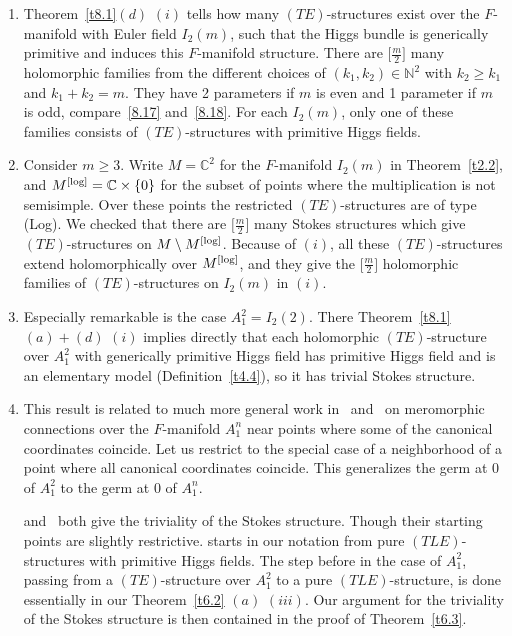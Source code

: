 \documentclass[10pt,a4paper]{amsart}
\numberwithin{equation}{section}
\numberwithin{figure}{section}
\newcommand{\N}{{\mathbb N}}
\newcommand{\C}{{\mathbb C}}
\begin{document}
\begin{Remarks}\label{t8.8}\quad

\begin{enumerate}\itemsep=0pt
\item[$(i)$] Theorem~\ref{t8.1}$(d)$ $(i)$ tells how many $(TE)$-structures
exist over the $F$-manifold with \mbox{Euler} field $I_2(m)$,
such that the Higgs bundle is generically primitive
and induces this $F$-manifold structure.
There are $\big[\frac{m}{2}\big]$ many holomorphic families
from the different choices of $(k_1,k_2)\allowbreak\in\N^2$ with
$k_2\geq k_1$ and $k_1+k_2=m$.
They have 2 parameters if $m$ is even and 1 parameter
if $m$ is odd, compare~\eqref{8.17} and~\eqref{8.18}.
For each $I_2(m)$, only one of these families consists
of $(TE)$-structures with primitive Higgs fields.

\item[$(ii)$] Consider $m\geq 3$.
Write $M=\C^2$ for the $F$-manifold $I_2(m)$
in Theorem~\ref{t2.2}, and $M^{\rm [log]}=\C\times\{0\}$
for the subset of points where the multiplication
is not semisimple. Over these points the restricted
$(TE)$-structures are of type (Log).
We checked that there are $\big[\frac{m}{2}\big]$ many Stokes
structures which give $(TE)$-structures on $M\setminus M^{\rm [log]}$.
Because of $(i)$, all these $(TE)$-structures extend
holomorphically over $M^{\rm [log]}$, and they give the
$\big[\frac{m}{2}\big]$ holomorphic families of $(TE)$-structures
on $I_2(m)$ in $(i)$.

\item[$(iii)$] Especially remarkable is the case $A_1^2=I_2(2)$.
There Theorem~\ref{t8.1}$(a){+}(d)$ $(i)$ implies directly that
each holomorphic $(TE)$-structure over $A_1^2$
with generically primitive Higgs field has primitive
Higgs field and is an elementary model (Definition~\ref{t4.4}),
so it has trivial Stokes structure.

\item[$(iv)$] This result is related to much more general work
in~\cite{CDG17} and~\cite{Sa19}
on meromorphic connections over the $F$-manifold
$A_1^n$ near points where some of the canonical
coordinates coincide.
Let us restrict to the special case of a neighborhood
of a point where all canonical coordinates coincide.
This generalizes the germ at 0 of $A_1^2$ to the germ at 0
of $A_1^n$.

\cite[Theorem~1.1]{CDG17} and~\cite[Theorem~3]{Sa19}
both give the triviality of the Stokes structure.
Though their starting points are slightly restrictive.
\cite{CDG17} starts in our notation from pure
$(TLE)$-structures with primitive Higgs fields.
The step before in the case of $A_1^2$,
passing from a $(TE)$-structure over $A_1^2$ to a pure
$(TLE)$-structure, is done essentially in our Theorem~\ref{t6.2} $(a)$ $(iii)$.
Our argument for the triviality of the Stokes structure
is then contained in the proof of Theorem~\ref{t6.3}.


\end{enumerate}
\end{Remarks}
\end{document}
